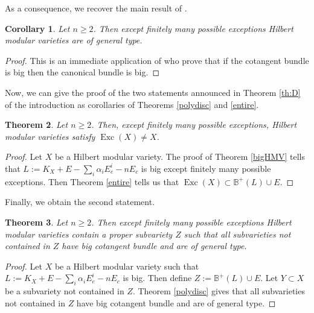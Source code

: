 \documentclass[10pt]{amsart}
\theoremstyle{plain}
\newtheorem{theorem}{Theorem}[section]
\newtheorem{corollary}[theorem]{Corollary}
\theoremstyle{definition}
\numberwithin{equation}{theorem}
\DeclareMathOperator{\Exc}{Exc}
\newcommand\BB{\mathbb B}
\begin{document}
As a consequence, we recover the main result of \cite{Tsu85}.

\begin{corollary}
Let $n \geq 2$. Then except finitely many possible exceptions Hilbert modular varieties are of general type.
\end{corollary}
\begin{proof}
This is an immediate application of \cite{CP15} who prove that if the cotangent bundle is big then the canonical bundle is big.
\end{proof}

Now, we can give the proof of the two statements announced in Theorem \ref{th:D} of the introduction as corollaries of Theorems \ref{polydisc} and \ref{entire}.

\begin{theorem}
Let $n \geq 2$. Then, except finitely many possible exceptions, Hilbert modular varieties satisfy $\Exc(X) \neq X$.
\end{theorem}
\begin{proof}
Let $X$ be a Hilbert modular variety. The proof of Theorem \ref{bigHMV} tells that $L:=K_X+E-\sum_i \alpha_i E_e^i - nE_c$ is big except finitely many possible exceptions. Then Theorem \ref{entire} tells us that $\Exc(X) \subset \BB^{+}(L)\cup E$.
\end{proof}

Finally, we obtain the second statement.

\begin{theorem}
Let $n \geq 2$. Then except finitely many possible exceptions Hilbert modular varieties contain a proper subvariety $Z$ such that all subvarieties not contained in $Z$ have big cotangent bundle and are of general type.
\end{theorem}

\begin{proof}
Let $X$ be a Hilbert modular variety such that $L:=K_X+E-\sum_i \alpha_i E_e^i - nE_c$ is big. Then define $Z:=\BB^{+}(L)\cup E$. Let $Y \subset X$ be a subvariety not contained in $Z$. Theorem \ref{polydisc} gives that all subvarieties not contained in $Z$ have big cotangent bundle and are of general type.
\end{proof}
\egroup
\end{document}
